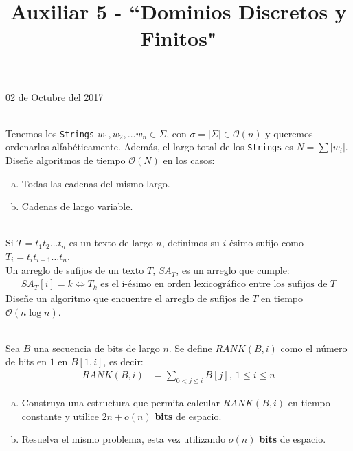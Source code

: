 \documentclass[dcc,uchile]{fcfmcourse}
\title{Auxiliar 5 - ``Dominios Discretos y Finitos"}
\theoremstyle{plain}
\theoremstyle{definition}
\begin{document}
\maketitle
\begin{center}
02 de Octubre del 2017
\end{center}


\vspace{-1ex}


\begin{problems}
\\
Tenemos los \texttt{Strings} $w_{1}, w_{2},\ldots w_{n} \in \Sigma$, con $\sigma = |\Sigma| \in \mathcal{O}(n)$ y queremos ordenarlos alfabéticamente. Además, el largo total de los \texttt{Strings} es $N = \sum |w_{i}|$.\\ Diseñe algoritmos de tiempo $\mathcal{O}(N)$ en los casos:
\begin{enumerate}[a)]
    \item Todas las cadenas del mismo largo.
    \item Cadenas de largo variable.
\end{enumerate}

\\
Si $T=t_{1}t_{2}\ldots t_{n}$ es un texto de largo $n$, definimos su $i$-ésimo sufijo como $T_{i} = t_{i}t_{i+1}\ldots t_{n}$.\\
Un arreglo de sufijos de un texto $T$, $SA_T$, es un arreglo que cumple:
\begin{align*}
    SA_T[i] = k \Leftrightarrow T_k\text{ es el i-ésimo en orden lexicográfico entre los sufijos de } T
\end{align*}
Diseñe un algoritmo que encuentre el arreglo de sufijos de $T$ en tiempo $\mathcal{O}(n\log{n})$.

\\
Sea $B$ una secuencia de bits de largo $n$. Se define $RANK(B, i)$ como el número de bits en $1$ en $B[1,i]$, es decir:
\begin{align*}
    RANK(B, i) &= \sum_{0<j\le i} B[j],\ 1\le i \le n
\end{align*}
\begin{enumerate}[a)]
    \item Construya una estructura que permita calcular $RANK(B,i)$ en tiempo constante y utilice $2n + o(n)$ \textbf{bits} de espacio.
    \item Resuelva el mismo problema, esta vez utilizando $o(n)$ \textbf{bits} de espacio.
\end{enumerate}

\end{problems}
\end{document}
